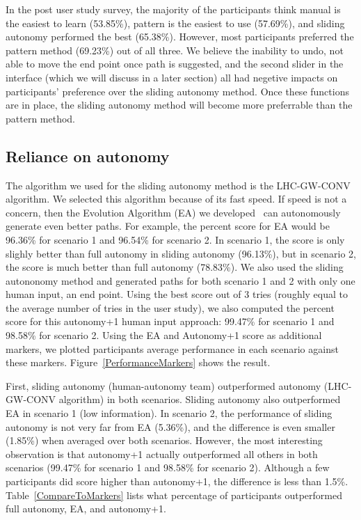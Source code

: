\documentclass[lettersize, apacite, twoside, HRI]{apa_HRI}
\begin{document}
In the post user study survey, the majority of the participants think manual is the easiest to learn (53.85\%), pattern is the easiest to use (57.69\%), and sliding autonomy performed the best (65.38\%). However, most participants preferred the pattern method (69.23\%) out of all three. We believe the inability to undo, not able to move the end point once path is suggested, and the second slider in the interface (which we will discuss in a later section) all had negetive impacts on participants' preference over the sliding autonomy method. Once these functions are in place, the sliding autonomy method will become more preferrable than the pattern method.

\subsection{Reliance on autonomy}

The algorithm we used for the sliding autonomy method is the LHC-GW-CONV algorithm. We selected this algorithm because of its fast speed. If speed is not a concern, then the Evolution Algorithm (EA) we developed~\cite{Lin2009UAV} can autonomously generate even better paths. For example, the percent score for EA would be 96.36\% for scenario 1 and 96.54\% for scenario 2. In scenario 1, the score is only slighly better than full autonomy in sliding autonomy (96.13\%), but in scenario 2, the score is much better than full autonomy (78.83\%). We also used the sliding autononomy method and generated paths for both scenario 1 and 2 with only one human input, an end point. Using the best score out of 3 tries (roughly equal to the average number of tries in the user study), we also computed the percent score for this autonomy+1 human input approach: 99.47\% for scenario 1 and 98.58\% for scenario 2. Using the EA and Autonomy+1 score as additional markers, we plotted participants average performance in each scenario against these markers. Figure~\ref{PerformanceMarkers} shows the result.

First, sliding autonomy (human-autonomy team) outperformed autonomy (LHC-GW-CONV algorithm) in both scenarios. Sliding autonomy also outperformed EA in scenario 1 (low information). In scenario 2, the performance of sliding autonomy is not very far from EA (5.36\%), and the difference is even smaller (1.85\%) when averaged over both scenarios. However, the most interesting observation is that autonomy+1 actually outperformed all others in both scenarios (99.47\% for scenario 1 and 98.58\% for scenario 2). Although a few participants did score higher than autonomy+1, the difference is less than 1.5\%. Table~\ref{CompareToMarkers} lists what percentage of participants outperformed full autonomy, EA, and autonomy+1.
\end{document}
